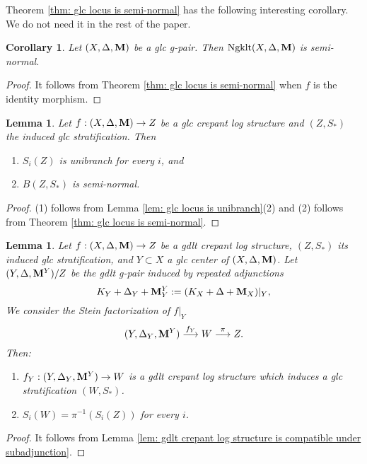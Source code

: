 \documentclass[11pt]{amsart}
\numberwithin{equation}{section}
\newcommand{\Mm}{{\bf{M}}}
\newcommand{\Ngklt}{\operatorname{Ngklt}}
\newtheorem{cor}[thm]{Corollary}
\newtheorem{lem}[thm]{Lemma}
\theoremstyle{definition}
\theoremstyle{definition}
\theoremstyle{definition}
\begin{document}
Theorem \ref{thm: glc locus is semi-normal} has the following interesting corollary. We do not need it in the rest of the paper.

\begin{cor}
Let $(X,\Delta,\Mm)$ be a glc g-pair. Then $\Ngklt(X,\Delta,\Mm)$ is semi-normal.
\end{cor}
\begin{proof}
It follows from Theorem \ref{thm: glc locus is semi-normal} when $f$ is the identity morphism.
\end{proof}



\begin{lem}\label{lem: (Z,S) is U and SN}
Let $f:(X,\Delta,\Mm)\to Z$ be a glc crepant log structure and $(Z,S_*)$ the induced glc stratification. Then
\begin{enumerate}
    \item  $S_i(Z)$ is unibranch for every $i$, and 
    \item  $B(Z,S_*)$ is semi-normal.
\end{enumerate}
\end{lem}

\begin{proof}
(1) follows from Lemma \ref{lem: glc locus is unibranch}(2) and (2) follows from Theorem \ref{thm: glc locus is semi-normal}.
\end{proof}


\begin{lem}\label{lem: stratification is compatible under adjunction}
Let $f: (X,\Delta,\Mm)\to Z$ be a gdlt crepant log structure, $(Z,S_*)$ its induced glc stratification, and $Y\subset X$ a glc center of $(X,\Delta,\Mm)$. Let $(Y,\Delta,\Mm^Y)/Z$ be the gdlt g-pair induced by repeated adjunctions
$$K_Y+\Delta_Y+\Mm^Y_Y:=(K_X+\Delta+\Mm_X)|_Y,$$
We consider the Stein factorization of $f|_Y$
$$(Y,\Delta_Y,\Mm^Y)\stackrel{f_Y}{\longrightarrow}W\stackrel{\pi}{\longrightarrow}Z.$$
Then:
\begin{enumerate}
    \item $f_Y:(Y,\Delta_Y,\Mm^Y)\to W$ is a gdlt crepant log structure which induces a glc stratification $(W,S_*)$.
    \item $S_i(W)=\pi^{-1}(S_i(Z))$ for every $i$.
\end{enumerate}
\end{lem}
\begin{proof}
It follows from Lemma \ref{lem: gdlt crepant log structure is compatible under subadjunction}.
\end{proof}
\end{document}
